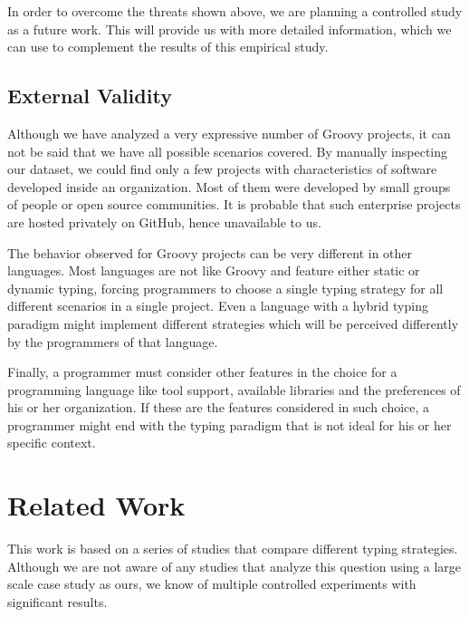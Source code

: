 \documentclass[preprint]{sigplanconf}
\begin{document}
In order to overcome the threats shown above, we are planning a controlled study as a future work.
This will provide us with more detailed information, which we can use to complement the results of this empirical study.

\subsection*{External Validity}
Although we have analyzed a very expressive number of Groovy projects, it can not be said that we have all possible scenarios covered.
By manually inspecting our dataset, we could find only a few projects with characteristics of software developed inside an organization.
Most of them were developed by small groups of people or open source communities.
It is probable that such enterprise projects are hosted privately on GitHub, hence unavailable to us.

The behavior observed for Groovy projects can be very different in other languages.
Most languages are not like Groovy and feature either static or dynamic typing, forcing programmers to choose a single typing strategy for all different scenarios in a single project.
Even a language with a hybrid typing paradigm might implement different strategies which will be perceived differently by the programmers of that language.

Finally, a programmer must consider other features in the choice for a programming language like tool support, available libraries and the preferences of his or her organization.
If these are the features considered in such choice, a programmer might end with the typing paradigm that is not ideal for his or her specific context.











%
%
\section{Related Work\label{related}}
This work is based on a series of studies that compare different typing strategies.
Although we are not aware of any studies that analyze this question using a large scale case study as ours, we know of multiple controlled experiments with significant results.
\end{document}
